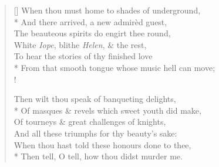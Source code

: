 \documentclass[MAIN]{subfiles}
\begin{document}
\settowidth{\versewidth}{When thou must home to shades of underground,}
\begin{verse}[\versewidth]
When thou must home to shades of underground,\\*
\vin And there arrived, a new admir\`ed guest,\\
The beauteous spirits do engirt thee round,\\
\vin White \emph{Iope}, blithe \emph{Helen}, \& the rest,\\
To hear the stories of thy finished love\\*
From that smooth tongue whose music hell can move;\\!

Then wilt thou speak of banqueting delights,\\*
\vin Of masques \& revels which sweet youth did make,\\
Of tourneys \& great challenges of knights,\\
\vin And all these triumphs for thy beauty's sake:\\
When thou hast told these honours done to thee,\\*
Then tell, O tell, how thou didst murder me.
\end{verse}
\end{document}
